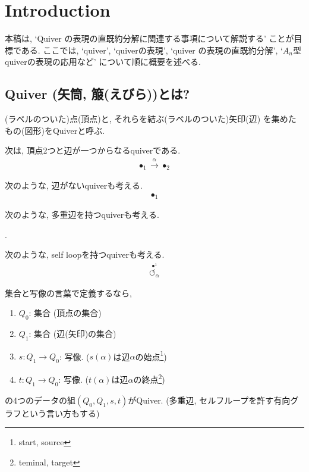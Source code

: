 
\newcommand{\ZU}{\marginpar{図を挿入}}


\chapter{Introduction}

本稿は,
`Quiver の表現の直既約分解に関連する事項について解説する'
ことが目標である.
ここでは,
`quiver',
`quiverの表現',
`quiver の表現の直既約分解',
`$A_n$型quiverの表現の応用など'
について順に概要を述べる.

\section{Quiver (矢筒, 箙(えびら))とは?}
(ラベルのついた)点(頂点)と,
それらを結ぶ(ラベルのついた)矢印(辺)
を集めたもの(図形)をQuiverと呼ぶ.
\begin{example}
  次は, 頂点2つと辺が一つからなるquiverである.
  \begin{align*}
    \bullet_{1} \xrightarrow{\alpha} \bullet_{2}
  \end{align*}
\end{example}
\begin{example}
  次のような, 辺がないquiverも考える.
  \begin{align*}
    \bullet_{1} 
  \end{align*}
\end{example}
\begin{example}
  次のような, 多重辺を持つquiverも考える.
  \begin{center}
    .
  \end{center}
\end{example}
\begin{example}
  次のような, self loopを持つquiverも考える.
  \begin{align*}
    \stackrel{\bullet^{1}}{\circlearrowleft_{\alpha}}
  \end{align*}
\end{example}

集合と写像の言葉で定義するなら,
\begin{enumerate}
\item $Q_0$: 集合 (頂点の集合)
\item $Q_1$: 集合 (辺(矢印)の集合)
\item $s\colon Q_1\to Q_0$: 写像. ($s(\alpha)$は辺$\alpha$の始点\footnote{start, source})
\item $t\colon Q_1\to Q_0$: 写像. ($t(\alpha)$は辺$\alpha$の終点\footnote{teminal, target})
\end{enumerate}
の4つのデータの組$(Q_0,Q_1,s,t)$がQuiver.
(多重辺, セルフループを許す有向グラフという言い方もする)


